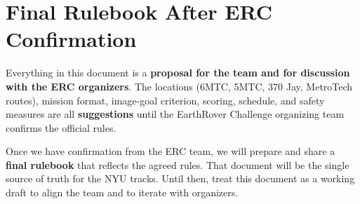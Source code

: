 \documentclass[11pt,a4paper]{article}
\begin{document}
\section*{Final Rulebook After ERC Confirmation}


Everything in this document is a \textbf{proposal for the team and for discussion with the ERC organizers}. The locations (6MTC, 5MTC, 370 Jay, MetroTech routes), mission format, image-goal criterion, scoring, schedule, and safety measures are all \textbf{suggestions} until the EarthRover Challenge organizing team confirms the official rules.

Once we have confirmation from the ERC team, we will prepare and share a \textbf{final rulebook} that reflects the agreed rules. That document will be the single source of truth for the NYU tracks. Until then, treat this document as a working draft to align the team and to iterate with organizers.
\end{document}
